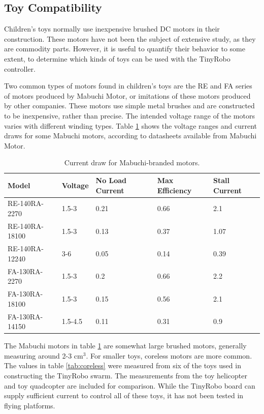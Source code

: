 \documentclass[]{article}
\begin{document}
\subsection{Toy Compatibility}

Children's toys normally use inexpensive brushed DC motors in their construction. 
These motors have not been the subject of extensive study, as they are commodity parts. 
However, it is useful to quantify their behavior to some extent, to determine which kinds of toys can be used with the TinyRobo controller. 

Two common types of motors found in children's toys are the RE and FA series of motors produced by Mabuchi Motor, or imitations of these motors produced by other companies. 
These motors use simple metal brushes and are constructed to be inexpensive, rather than precise. 
The intended voltage range of the motors varies with different winding types. 
Table \ref{tab:properBrandedMotors} shows the voltage ranges and current draws for some Mabuchi motors, according to datasheets available from Mabuchi Motor.

\begin{table}
	\begin{tabular}{l l l l l}
	Model & Voltage & No Load Current & Max Efficiency & Stall Current\\
	\hline
	RE-140RA-2270 & 1.5-3 & 0.21 & 0.66 & 2.1 \\
	RE-140RA-18100 & 1.5-3 & 0.13 & 0.37 & 1.07 \\
	RE-140RA-12240 & 3-6 & 0.05 & 0.14 & 0.39 \\
	FA-130RA-2270 & 1.5-3 & 0.2 & 0.66 & 2.2\\
	FA-130RA-18100 & 1.5-3 & 0.15 & 0.56 & 2.1\\
	FA-130RA-14150 & 1.5-4.5 & 0.11 & 0.31 & 0.9\\
	\end{tabular}
	\caption{Current draw for Mabuchi-branded motors.}
	\label{tab:properBrandedMotors}
\end{table}

The Mabuchi motors in table \ref{tab:properBrandedMotors} are somewhat large brushed motors, generally measuring around 2-3 cm$^3$. 
For smaller toys, coreless motors are more common. 
The values in table \ref{tab:coreless} were measured from six of the toys used in constructing the TinyRobo swarm.
The measurements from the toy helicopter and toy quadcopter are included for comparison.
While the TinyRobo board can supply sufficient current to control all of these toys, it has not been tested in flying platforms.
\end{document}
